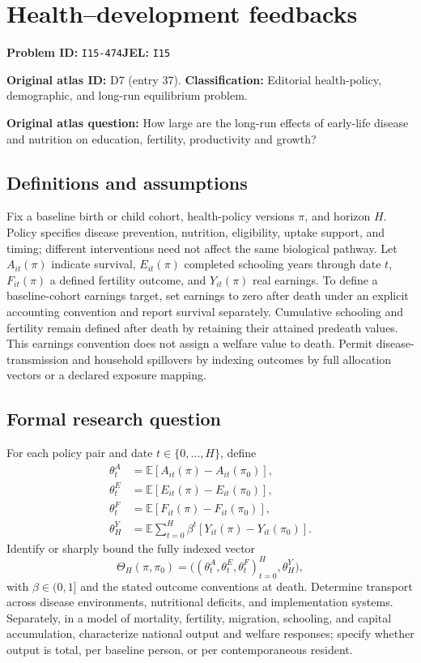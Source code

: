 \documentclass[11pt,a4paper]{article}
\begin{document}
\section*{Health–development feedbacks}
\textbf{Problem ID:} \texttt{I15-474}\quad \textbf{JEL:} \texttt{I15}\par
\label{problem:OP-0037}
\label{atlas:prob:D7}
\noindent\textbf{Original atlas ID:} D7 (entry 37). \textbf{Classification:} Editorial health-policy, demographic, and long-run equilibrium problem.

\noindent\textbf{Original atlas question:} How large are the long-run effects of early-life disease and nutrition on education, fertility, productivity and growth?

\subsection*{Definitions and assumptions}
Fix a baseline birth or child cohort, health-policy versions $\pi$, and horizon $H$. Policy specifies disease prevention, nutrition, eligibility, uptake support, and timing; different interventions need not affect the same biological pathway. Let $A_{it}(\pi)$ indicate survival, $E_{it}(\pi)$ completed schooling years through date $t$, $F_{it}(\pi)$ a defined fertility outcome, and $Y_{it}(\pi)$ real earnings. To define a baseline-cohort earnings target, set earnings to zero after death under an explicit accounting convention and report survival separately. Cumulative schooling and fertility remain defined after death by retaining their attained predeath values. This earnings convention does not assign a welfare value to death. Permit disease-transmission and household spillovers by indexing outcomes by full allocation vectors or a declared exposure mapping.
\subsection*{Formal research question}
For each policy pair and date $t\in\{0,\ldots,H\}$, define
\begin{align*}
 \theta^A_t&=\mathbb E[A_{it}(\pi)-A_{it}(\pi_0)],\\
 \theta^E_t&=\mathbb E[E_{it}(\pi)-E_{it}(\pi_0)],\\
 \theta^F_t&=\mathbb E[F_{it}(\pi)-F_{it}(\pi_0)],\\
 \theta^Y_H&=\mathbb E\sum_{t=0}^H\beta^t
                    [Y_{it}(\pi)-Y_{it}(\pi_0)].
\end{align*}
Identify or sharply bound the fully indexed vector
\[
 \Theta_H(\pi,\pi_0)
    =\bigl((\theta^A_t,\theta^E_t,\theta^F_t)_{t=0}^H,\theta^Y_H\bigr),
\]
with $\beta\in(0,1]$ and the stated outcome conventions at death. Determine transport across disease environments, nutritional deficits, and implementation systems. Separately, in a model of mortality, fertility, migration, schooling, and capital accumulation, characterize national output and welfare responses; specify whether output is total, per baseline person, or per contemporaneous resident.
\end{document}
